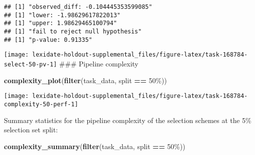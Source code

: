 \documentclass[
]{book}
\newenvironment{Shaded}{\begin{snugshade}}{\end{snugshade}}
\newcommand{\AttributeTok}[1]{\textcolor[rgb]{0.13,0.29,0.53}{#1}}
\newcommand{\DecValTok}[1]{\textcolor[rgb]{0.00,0.00,0.81}{#1}}
\newcommand{\FunctionTok}[1]{\textcolor[rgb]{0.13,0.29,0.53}{\textbf{#1}}}
\newcommand{\NormalTok}[1]{#1}
\newcommand{\OtherTok}[1]{\textcolor[rgb]{0.56,0.35,0.01}{#1}}
\newcommand{\SpecialCharTok}[1]{\textcolor[rgb]{0.81,0.36,0.00}{\textbf{#1}}}
\newcommand{\StringTok}[1]{\textcolor[rgb]{0.31,0.60,0.02}{#1}}
\begin{document}
\begin{Shaded}
\end{Shaded}

\begin{verbatim}
## [1] "observed_diff: -0.104445353599085"
## [1] "lower: -1.98629617822013"
## [1] "upper: 1.98629465100794"
## [1] "fail to reject null hypothesis"
## [1] "p-value: 0.91335"
\end{verbatim}

\texttt{[image: lexidate-holdout-supplemental\_files/figure-latex/task-168784-select-50-pv-1]}
\#\#\# Pipeline complexity

\begin{Shaded}
\begin{Highlighting}[]
\FunctionTok{complexity\_plot}\NormalTok{(}\FunctionTok{filter}\NormalTok{(task\_data, split }\SpecialCharTok{==} \StringTok{\textquotesingle{}50\%\textquotesingle{}}\NormalTok{))}
\end{Highlighting}
\end{Shaded}

\texttt{[image: lexidate-holdout-supplemental\_files/figure-latex/task-168784-complexity-50-perf-1]}

Summary statistics for the pipeline complexity of the selection schemes at the 5\% selection set split:

\begin{Shaded}
\begin{Highlighting}[]
\FunctionTok{complexity\_summary}\NormalTok{(}\FunctionTok{filter}\NormalTok{(task\_data, split }\SpecialCharTok{==} \StringTok{\textquotesingle{}50\%\textquotesingle{}}\NormalTok{))}
\end{Highlighting}
\end{Shaded}
\end{document}
